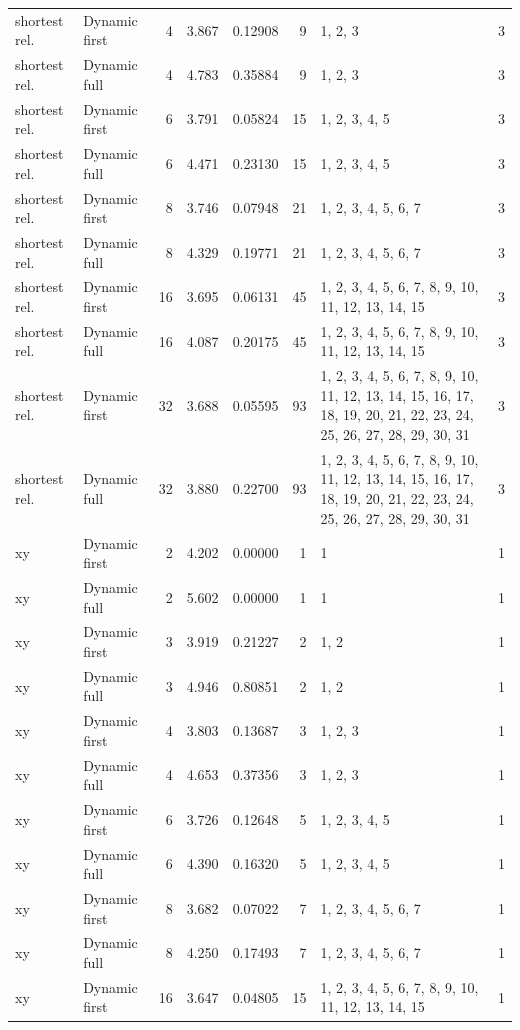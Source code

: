 \documentclass[10pt,a4paper]{article}
\begin{document}
\begin{longtable}{@{}p{23mm}p{29mm}rrrrp{36mm}r@{}}
shortest rel. & Dynamic first & 4 & 3.867 & 0.12908 & 9 & 1, 2, 3 & 3 \\
shortest rel. & Dynamic full & 4 & 4.783 & 0.35884 & 9 & 1, 2, 3 & 3 \\
shortest rel. & Dynamic first & 6 & 3.791 & 0.05824 & 15 & 1, 2, 3, 4, 5 & 3 \\
shortest rel. & Dynamic full & 6 & 4.471 & 0.23130 & 15 & 1, 2, 3, 4, 5 & 3 \\
shortest rel. & Dynamic first & 8 & 3.746 & 0.07948 & 21 & 1, 2, 3, 4, 5, 6, 7 & 3 \\
shortest rel. & Dynamic full & 8 & 4.329 & 0.19771 & 21 & 1, 2, 3, 4, 5, 6, 7 & 3 \\
shortest rel. & Dynamic first & 16 & 3.695 & 0.06131 & 45 & 1, 2, 3, 4, 5, 6, 7, 8, 9, 10, 11, 12, 13, 14, 15 & 3 \\
shortest rel. & Dynamic full & 16 & 4.087 & 0.20175 & 45 & 1, 2, 3, 4, 5, 6, 7, 8, 9, 10, 11, 12, 13, 14, 15 & 3 \\
shortest rel. & Dynamic first & 32 & 3.688 & 0.05595 & 93 & 1, 2, 3, 4, 5, 6, 7, 8, 9, 10, 11, 12, 13, 14, 15, 16, 17, 18, 19, 20, 21, 22, 23, 24, 25, 26, 27, 28, 29, 30, 31 & 3 \\
shortest rel. & Dynamic full & 32 & 3.880 & 0.22700 & 93 & 1, 2, 3, 4, 5, 6, 7, 8, 9, 10, 11, 12, 13, 14, 15, 16, 17, 18, 19, 20, 21, 22, 23, 24, 25, 26, 27, 28, 29, 30, 31 & 3 \\
xy & Dynamic first & 2 & 4.202 & 0.00000 & 1 & 1 & 1 \\
xy & Dynamic full & 2 & 5.602 & 0.00000 & 1 & 1 & 1 \\
xy & Dynamic first & 3 & 3.919 & 0.21227 & 2 & 1, 2 & 1 \\
xy & Dynamic full & 3 & 4.946 & 0.80851 & 2 & 1, 2 & 1 \\
xy & Dynamic first & 4 & 3.803 & 0.13687 & 3 & 1, 2, 3 & 1 \\
xy & Dynamic full & 4 & 4.653 & 0.37356 & 3 & 1, 2, 3 & 1 \\
xy & Dynamic first & 6 & 3.726 & 0.12648 & 5 & 1, 2, 3, 4, 5 & 1 \\
xy & Dynamic full & 6 & 4.390 & 0.16320 & 5 & 1, 2, 3, 4, 5 & 1 \\
xy & Dynamic first & 8 & 3.682 & 0.07022 & 7 & 1, 2, 3, 4, 5, 6, 7 & 1 \\
xy & Dynamic full & 8 & 4.250 & 0.17493 & 7 & 1, 2, 3, 4, 5, 6, 7 & 1 \\
xy & Dynamic first & 16 & 3.647 & 0.04805 & 15 & 1, 2, 3, 4, 5, 6, 7, 8, 9, 10, 11, 12, 13, 14, 15 & 1 \\

\end{longtable}
\end{document}
